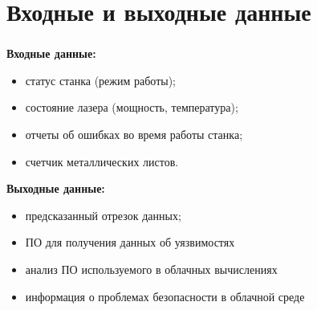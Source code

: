 
\section{Входные и выходные данные}

\begin{frame}
\frametitle{\insertsection}

\textbf{Входные данные:}
\begin{itemize}
    \item статус станка (режим работы);
    \item состояние лазера (мощность, температура);
    \item отчеты об ошибках во время работы станка;
    \item счетчик металлических листов.
\end{itemize}

\vspace{\baselineskip}

\textbf{Выходные данные:}
\begin{itemize}
    \item предсказанный отрезок данных;
    \item ПО для получения данных об уязвимостях
    \item анализ ПО используемого в облачных вычислениях
    \item информация о проблемах безопасности в облачной среде
\end{itemize}

\end{frame}

